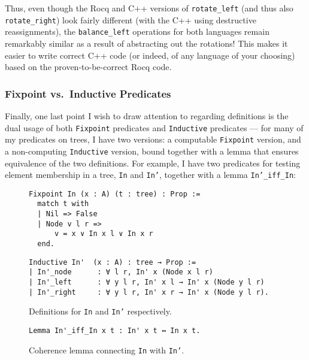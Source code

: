 \documentclass[acmsmall, authorversion, nonacm, overload]{acmart}
\begin{document}
Thus, even though the Rocq and C++ versions of \texttt{rotate_left} (and thus also \texttt{rotate_right})
look fairly different (with the C++ using destructive reassignments),
the \texttt{balance_left} operations for both languages remain remarkably similar
as a result of abstracting out the rotations!
This makes it easier to write correct C++ code (or indeed, of any language of your choosing)
based on the proven-to-be-correct Rocq code.

\subsubsection{Fixpoint vs.\ Inductive Predicates}
Finally, one last point I wish to draw attention to regarding definitions is
the dual usage of both \texttt{Fixpoint} predicates and
\texttt{Inductive} predicates --- for many of my predicates on trees,
I have two versions: a computable \texttt{Fixpoint} version, and a non-computing \texttt{Inductive} version,
bound together with a lemma that ensures equivalence of the two definitions.
For example, I have two predicates for testing element membership in a tree, \texttt{In} and \texttt{In'},
together with a lemma \texttt{In'_iff_In}:
\begin{figure}[htb!]
  \centering
  \begin{minipage}{0.45\textwidth}
    \centering
  \begin{verbatim}
Fixpoint In (x : A) (t : tree) : Prop :=
  match t with
  | Nil => False
  | Node v l r =>
      v = x ∨ In x l ∨ In x r
  end.
  \end{verbatim}
  \end{minipage}%
  \begin{minipage}{0.55\textwidth}
  \flushleft
  \begin{verbatim}
Inductive In'  (x : A) : tree → Prop :=
| In'_node      : ∀ l r, In' x (Node x l r)
| In'_left      : ∀ y l r, In' x l → In' x (Node y l r)
| In'_right     : ∀ y l r, In' x r → In' x (Node y l r).
  \end{verbatim}
  \end{minipage}%
  \centering
  \vspace{0.5em}
  \caption{Definitions for \texttt{In} and \texttt{In'} respectively.}
\end{figure}%
\begin{figure}[htb!]
  \centering
  \begin{minipage}{0.5\textwidth}
  \begin{verbatim}
Lemma In'_iff_In x t : In' x t ↔ In x t.
  \end{verbatim}
  \end{minipage}
  \caption{Coherence lemma connecting \texttt{In} with \texttt{In'}.}
\end{figure}%
\end{document}
